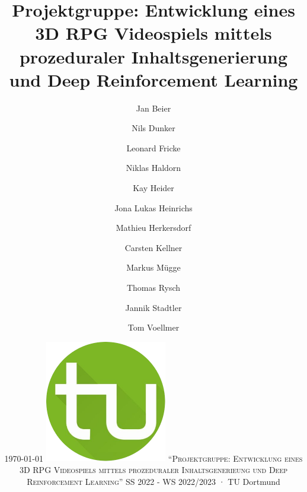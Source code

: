 %
%
\newcommand\svperson{Jan Beier, Nils Dunker, Leonard Fricke, Niklas Haldorn, Kay Heider, \linebreak Jona Lukas Heinrichs, Mathieu Herkersdorf, Carsten Kellner, Markus Mügge, Thomas Rysch, Jannik Stadtler, Tom Voellmer}
\newcommand\svdatum{\today} %
\newcommand\lvname{Projektgruppe: Entwicklung eines 3D RPG Videospiels mittels prozeduraler Inhaltsgenerieung und Deep Reinforcement Learning}
\newcommand\lvtyp{SS 2022 - WS 2022/2023}
\newcommand\lvinst{TU Dortmund}



	
	\title{ \huge\textbf{Projektgruppe: \linebreak \linebreak Entwicklung eines 3D RPG Videospiels mittels prozeduraler Inhaltsgenerierung und Deep Reinforcement Learning} }
	\author{Jan Beier \and Nils Dunker \and Leonard Fricke \and Niklas Haldorn \and Kay Heider \and Jona Lukas Heinrichs \and Mathieu Herkersdorf \and Carsten Kellner \and Markus Mügge \and Thomas Rysch \and Jannik Stadtler \and Tom Voellmer}
	\date{\LARGE{\svdatum} \linebreak \linebreak \normalsize \centering \includegraphics[width=0.4\textwidth]{ressources/tu-dortmund.png} \linebreak \linebreak \large\textsc{"`\lvname"'} \linebreak \linebreak \large{\lvtyp} · \large{\lvinst}}
	
	\maketitle
	\thispagestyle{empty} %

